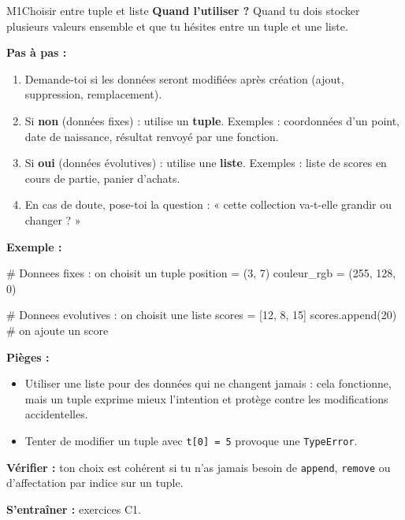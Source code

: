 \begin{fichemethode}{M1}{Choisir entre tuple et liste}
\textbf{Quand l'utiliser ?} Quand tu dois stocker plusieurs valeurs ensemble et que tu hésites entre un tuple et une liste.

\textbf{Pas à pas :}
\begin{enumerate}
  \item Demande-toi si les données seront modifiées après création (ajout, suppression, remplacement).
  \item Si \textbf{non} (données fixes) : utilise un \textbf{tuple}. Exemples : coordonnées d'un point, date de naissance, résultat renvoyé par une fonction.
  \item Si \textbf{oui} (données évolutives) : utilise une \textbf{liste}. Exemples : liste de scores en cours de partie, panier d'achats.
  \item En cas de doute, pose-toi la question : « cette collection va-t-elle grandir ou changer ? »
\end{enumerate}

\textbf{Exemple :}
\begin{python}
# Donnees fixes : on choisit un tuple
position = (3, 7)
couleur_rgb = (255, 128, 0)

# Donnees evolutives : on choisit une liste
scores = [12, 8, 15]
scores.append(20)  # on ajoute un score
\end{python}

\textbf{Pièges :}
\begin{itemize}
  \item Utiliser une liste pour des données qui ne changent jamais : cela fonctionne, mais un tuple exprime mieux l'intention et protège contre les modifications accidentelles.
  \item Tenter de modifier un tuple avec \lstinline{t[0] = 5} provoque une \lstinline{TypeError}.
\end{itemize}

\textbf{Vérifier :} ton choix est cohérent si tu n'as jamais besoin de \lstinline{append}, \lstinline{remove} ou d'affectation par indice sur un tuple.

\textbf{S'entraîner :} exercices C1.
\end{fichemethode}
